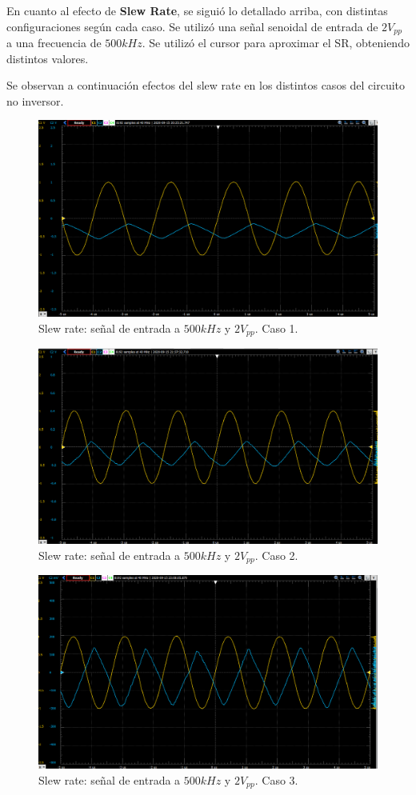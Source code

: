 En cuanto al efecto de \textbf{Slew Rate}, se siguió lo detallado arriba, con 
distintas configuraciones según cada caso. Se utilizó una señal senoidal de entrada de $2V_{pp}$ a una frecuencia de $500kHz$. Se utilizó el cursor para aproximar el SR, obteniendo distintos valores.

Se observan a continuación efectos del slew rate en los distintos casos del circuito no inversor.


\begin{figure}[H]
	\centering
	\includegraphics[scale=0.3]{./Imagenes/NoInvCaso1SR.png}
	\caption{Slew rate: señal de entrada a $500kHz$ y $2V_{pp}$. Caso 1.}
	\label{fig:circinvcaso1}
\end{figure}

\begin{figure}[H]
	\centering
	\includegraphics[scale=0.3]{./Imagenes/NoInvCaso2SR.png}
	\caption{Slew rate: señal de entrada a $500kHz$ y $2V_{pp}$. Caso 2.}
	\label{fig:circinvcaso1}
\end{figure}

\begin{figure}[H]
	\centering
	\includegraphics[scale=0.3]{./Imagenes/NoInvCaso3SR.png}
	\caption{Slew rate: señal de entrada a $500kHz$ y $2V_{pp}$. Caso 3.}
	\label{fig:circinvcaso1}
\end{figure}

